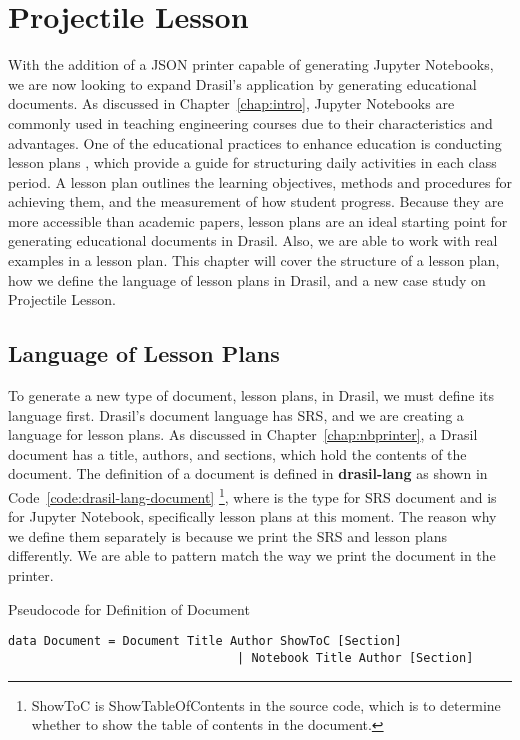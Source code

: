 \chapter{Projectile Lesson} \label{chap:casestudy}
With the addition of a JSON printer capable of generating Jupyter Notebooks, we 
are now looking to expand Drasil's application by generating educational 
documents. As discussed in Chapter~\ref{chap:intro}, Jupyter Notebooks are 
commonly used in teaching engineering courses due to their characteristics and 
advantages. One of the educational practices to enhance education is conducting 
lesson plans \cite{cicek2013effective, wong2018first}, which provide a 
guide for structuring daily activities in each class period. A lesson plan 
outlines the learning objectives, methods and procedures for achieving them, 
and the measurement of how student progress. Because they are more accessible 
than academic papers, lesson plans are an ideal starting point for generating 
educational documents in Drasil. Also, we are able to work with real examples 
in a lesson plan. This chapter will cover the structure of a lesson plan, how 
we define the language of lesson plans in Drasil, and a new case study on 
Projectile Lesson.

\section{Language of Lesson Plans}
To generate a new type of document, lesson plans, in Drasil, we must define its 
language first. Drasil's document language has SRS, and we are creating a 
language for lesson plans. As discussed in Chapter~\ref{chap:nbprinter}, a 
Drasil document has a title, authors, and sections, which hold the contents 
of the document. The definition of a document is defined in 
\textbf{drasil-lang} as 
shown in Code~\ref{code:drasil-lang-document} \footnote{ShowToC is 
ShowTableOfContents in the source code, which is to determine whether to show 
the table of contents in the document.}, where  is the type 
for SRS document and  is for Jupyter Notebook, specifically 
lesson plans at this moment. The reason why we define them separately is 
because we print the SRS and lesson plans differently. We are able to pattern 
match the way we print the document in the printer. 

\begin{listing}[h]
	\caption{Pseudocode for Definition of Document}
	\label{code:drasil-lang-document}
	\begin{lstlisting}[language=haskell1]
	data Document = Document Title Author ShowToC [Section]
								| Notebook Title Author [Section]
	\end{lstlisting}
\end{listing}


